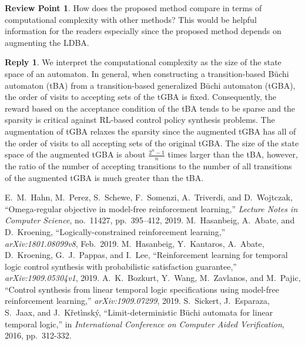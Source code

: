 \documentclass[10 pt, dvipdfmx]{article}
\theoremstyle{definition}
\newtheorem{review point}{Review Point}[section]
\newtheorem*{reply}{Reply}
\begin{document}
\begin{review point}
  How does the proposed method compare in terms of computational
complexity with other methods? This would be helpful information for
the readers especially since the proposed method depends on augmenting
the LDBA.
\end{review point}

\begin{reply}
  We interpret the computational complexity as the size of the state space of an automaton. In general, when constructing a transition-based B\"{u}chi automaton (tBA) from a transition-based generalized B\"{u}chi automaton (tGBA), the order of visits to accepting sets of the tGBA is fixed. Consequently, the reward based on the acceptance condition of the tBA tends to be sparse and the sparsity is critical against RL-based control policy synthesis problems. The augmentation of tGBA relaxes the sparsity since the augmented tGBA has all of the order of visits to all accepting sets of the original tGBA. The size of the state space of the augmented tGBA is about $\frac{2^{n}-1}{n}$ times larger than the tBA, however, the ratio of the number of accepting transitions to the number of all transitions of the augmented tGBA is much greater than the tBA.
\end{reply}

\begin{thebibliography}{99}
E.\ M.\ Hahn, M.\ Perez, S.\ Schewe, F.\ Somenzi, A.\ Triverdi, and D.\ Wojtczak,
``Omega-regular objective in model-free reinforcement learning,''
\textit{Lecture Notes in Computer Science}, no.\ 11427, pp.\ 395--412, 2019.
M.\ Hasanbeig, A.\ Abate, and D.\ Kroening,
``Logically-constrained reinforcement learning,'' \textit{arXiv:1801.08099v8}, Feb.\ 2019.
M.\ Hasanbeig, Y.\ Kantaros, A.\ Abate, D.\ Kroening, G.\ J.\ Pappas, and I.\ Lee,
``Reinforcement learning for temporal logic control synthesis with probabilistic satisfaction guarantee,''
\textit{arXiv:1909.05304v1}, 2019.
A.\ K.\ Bozkurt, Y.\ Wang, M.\ Zavlanos, and M.\ Pajic,
``Control synthesis from linear temporal logic specifications using model-free reinforcement learning,''
\textit{arXiv:1909.07299}, 2019.
S.\ Sickert, J.\ Esparaza, S.\ Jaax, and J.\ K\v{r}et\`{i}nsk\'{y},
``Limit-deterministic B\"{u}chi automata for linear temporal logic,''
 in \textit{International Conference on Computer Aided Verification}, 2016, pp.\ 312-332.
\end{thebibliography}
\end{document}
